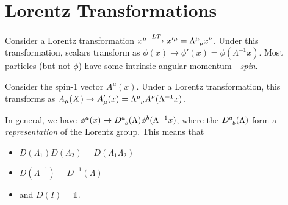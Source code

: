 \section{Lorentz Transformations}%
\label{sec:lorentz_transformations}

Consider a Lorentz transformation $x^{\mu} \xrightarrow{LT} x'^{\mu} = \Lambda \indices{^{\mu}_{\nu}} x^{\nu}$. Under this transformation, scalars transform as $\phi(x) \to \phi'(x) = \phi(\Lambda^{-1}x)$.
Most particles (but not $\phi$) have some intrinsic angular momentum---\emph{spin}.
\begin{example}[]
  Consider the spin-1 vector $A^{\mu}(x)$.
  Under a Lorentz transformation, this transforms as $A_{\mu}(X) \to A_{\mu}'(x) = \Lambda \indices{^{\mu}_{\nu}} A^{\nu}(\Lambda^{-1} x)$. 
\end{example}
In general, we have $\phi^a(x) \to D \indices{^a_b} (\Lambda) \phi^b(\Lambda^{-1} x)$, where the $D \indices{^a_b}(\Lambda)$ form a \emph{representation} of the Lorentz group.
This means that
\begin{itemize}
  \item $D(\Lambda_1) D(\Lambda_2) = D(\Lambda_1 \Lambda_2)$
  \item $D(\Lambda^{-1}) = D^{-1}(\Lambda)$
  \item and $D(I) = \mathbb{1}$.
\end{itemize}

